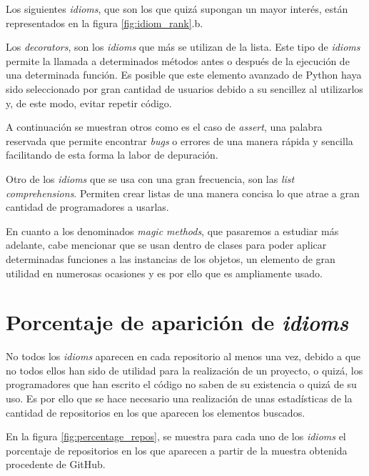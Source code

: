 \documentclass[a4paper, 12pt]{book}
\begin{document}
Los siguientes \textit{idioms}, que son los que quizá supongan un mayor interés, están representados en la figura \ref{fig:idiom_rank}.b.

Los \textit{decorators}, son los \textit{idioms} que más se utilizan de la lista. Este tipo de \textit{idioms} permite la llamada a determinados métodos antes o después de la ejecución de una determinada función. Es posible que este elemento avanzado de Python haya sido seleccionado por gran cantidad de usuarios debido a su sencillez al utilizarlos y, de este modo, evitar repetir código.

A continuación se muestran otros como es el caso de \textit{assert}, una palabra reservada que permite encontrar \textit{bugs} o errores de una manera rápida y sencilla facilitando de esta forma la labor de depuración.

Otro de los \textit{idioms} que se usa con una gran frecuencia, son las \textit{list comprehensions}. Permiten crear listas de una manera concisa lo que atrae a gran cantidad de programadores a usarlas.

En cuanto a los denominados \textit{magic methods}, que pasaremos a estudiar más adelante, cabe mencionar que se usan dentro de clases para poder aplicar determinadas funciones a las instancias de los objetos, un elemento de gran utilidad en numerosas ocasiones y es por ello que es ampliamente usado.




\section{Porcentaje de aparición de \textit{idioms}}

No todos los \textit{idioms} aparecen en cada repositorio al menos una vez, debido a que no todos ellos han sido de utilidad para la realización de un proyecto, o quizá, los programadores que han escrito el código no saben de su existencia o quizá de su uso. Es por ello que se hace necesario una realización de unas estadísticas de la cantidad de repositorios en los que aparecen los elementos buscados.

En la figura \ref{fig:percentage_repos}, se muestra para cada uno de los \textit{idioms} el porcentaje de repositorios en los que aparecen a partir de la muestra obtenida procedente de GitHub.
\end{document}
